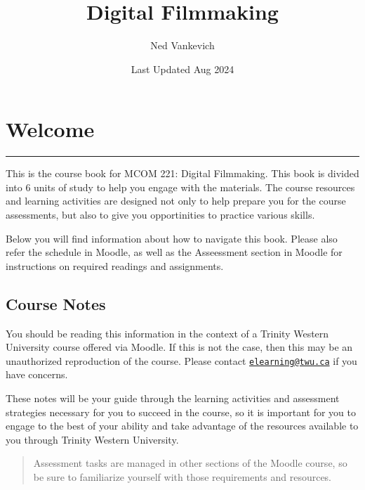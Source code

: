\documentclass[
]{book}
\title{Digital Filmmaking}
\author{Ned Vankevich}
\date{Last Updated Aug 2024}
\begin{document}
\maketitle

{
\setcounter{tocdepth}{1}
\tableofcontents
}
\hypertarget{welcome}{%
\chapter*{Welcome}\label{welcome}}

\begin{center}\rule{0.5\linewidth}{0.5pt}\end{center}

This is the course book for MCOM 221: Digital Filmmaking. This book is divided into 6 units of study to help you engage with the materials. The course resources and learning activities are designed not only to help prepare you for the course assessments, but also to give you opportinities to practice various skills.

Below you will find information about how to navigate this book. Please also refer the schedule in Moodle, as well as the Asseessment section in Moodle for instructions on required readings and assignments.

\hypertarget{course-notes}{%
\section*{Course Notes}\label{course-notes}}

You should be reading this information in the context of a Trinity Western University course offered via Moodle. If this is not the case, then this may be an unauthorized reproduction of the course. Please contact \href{mailto:elearning@twu.ca}{\nolinkurl{elearning@twu.ca}} if you have concerns.

These notes will be your guide through the learning activities and assessment strategies necessary for you to succeed in the course, so it is important for you to engage to the best of your ability and take advantage of the resources available to you through Trinity Western University.

\begin{quote}
Assessment tasks are managed in other sections of the Moodle course, so be sure to familiarize yourself with those requirements and resources.
\end{quote}
\end{document}
